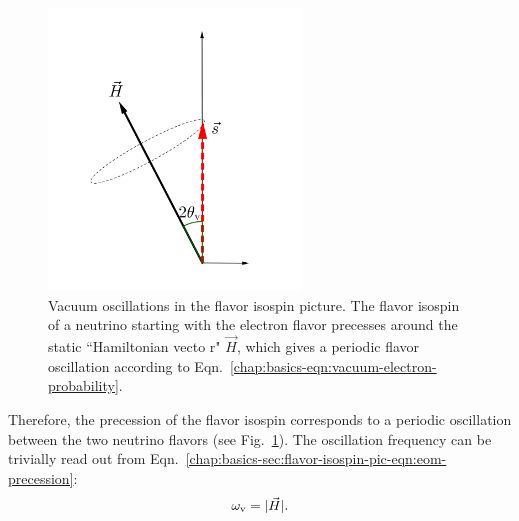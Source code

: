 \begin{figure}[htbp]
    \centering
    \includegraphics[width=0.6\textwidth]{chapters/assets/basics/flavor-isospin-vac-osc}
    \caption{Vacuum oscillations in the flavor isospin picture. The flavor isospin of a neutrino starting with the electron flavor precesses around the static ``Hamiltonian vecto
    r" $\vec H$, which gives a periodic flavor oscillation according to Eqn.~\eqref{chap:basics-eqn:vacuum-electron-probability}.}
    \label{chap:basics-sec:flavor-isospin-pic-fig:flavor-isospin-vac-osc}
\end{figure}
Therefore, the precession of the flavor isospin corresponds to a periodic oscillation between the two neutrino flavors (see Fig.~\ref{chap:basics-sec:flavor-isospin-pic-fig:flavor-isospin-vac-osc}).
The oscillation frequency can be trivially read out from Eqn.~\eqref{chap:basics-sec:flavor-isospin-pic-eqn:eom-precession}:
\begin{equation}
\omega_\mathrm v = \lvert \vec{H} \rvert.
\end{equation}




